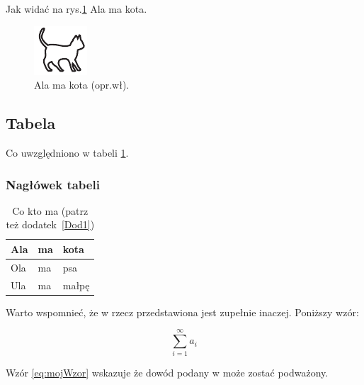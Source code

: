 Jak widać na rys.\ref{rysunek:kot} Ala ma kota. \lipsum[9-10] 

\begin{figure}
\centering\includegraphics[width=.4\textwidth]{img/kotek}
\caption{Ala ma kota (opr.wł).}\label{rysunek:kot}
\end{figure}

\subsection{Tabela}

Co uwzględniono w tabeli \ref{tabela:coktoma}. \lipsum[13-15] 

\subsubsection{Nagłówek tabeli}

\begin{table}
\centering\caption{Co kto ma \cite{harel_rzecz_2008} (patrz też dodatek~\ref{Dod1}) \label{tabela:coktoma}}
\begin{tabular}{|l|l|l|}%
\hline
Ala & ma & kota \\
\hline
Ola & ma & psa \\
\hline
Ula & ma & małpę\\
\hline
\end{tabular}
\end{table}

\lipsum[19-20] Warto wspomnieć, że w \cite{aizawa_groundwater_2009} rzecz przedstawiona jest zupełnie inaczej. Poniższy wzór:

\begin{equation}
\sum_{i=1}^{\infty}a_i
\label{eq:mojWzor}
\end{equation}

Wzór \ref{eq:mojWzor} wskazuje że dowód podany w \cite{kaleta_experimental_2005} może zostać podważony. \lipsum[9]

